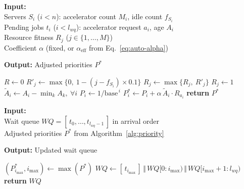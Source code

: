 \documentclass{ieeetj}
\begin{document}
\begin{algorithm}
\caption{SAFA adjusted priority}\label{alg:priority}
\textbf{Input:} \\
\hspace*{4mm} Servers $S_i$ ($i{<}n$): accelerator count $M_i$, idle count $f_{S_i}$ \\
\hspace*{4mm} Pending jobs $t_i$ ($i{<}l_{wq}$): accelerator request $a_i$, age $A_i$ \\
\hspace*{4mm} Resource fitness $R_j$ ($j\in\{1,\ldots,M\}$) \\
\hspace*{4mm} Coefficient $\alpha$ (fixed, or $\alpha_{\text{eff}}$ from Eq.~\eqref{eq:auto-alpha})
\begin{flushleft}
\textbf{Output:} Adjusted priorities $P^*$
\end{flushleft}
\begin{algorithmic}[1]
\STATE $R \gets 0$
\STATE {}
            \STATE $R'_j \gets \max\{0,\ 1 - ( j - f_{S_i} ) \times 0.1\}$ 
            \STATE $R_j \gets \max\{R_j,\ R'_j\}$
        \ELSE
            \STATE $R_j \gets 1$ 
        \ENDIF
    \ENDFOR
\ENDFOR
\STATE {}
\STATE $\tilde A_i \gets A_i - \min_k A_k,\ \forall i$ 
    \STATE $P_i \gets 1/\text{base}^{\,i}$
    \STATE $P_i^* \gets P_i + \alpha\, \tilde A_i \cdot R_{a_i}$
\ENDFOR
\STATE \textbf{return} $P^*$
\end{algorithmic}
\end{algorithm}

\begin{algorithm}
\caption{SAFA queue reordering}\label{alg:reorder}
\textbf{Input:} \\
\hspace*{4mm} Wait queue $WQ=[\,t_0,\ldots,t_{l_{wq}-1}\,]$ in arrival order \\
\hspace*{4mm} Adjusted priorities $P^*$ from Algorithm~\ref{alg:priority}
\begin{flushleft}
\textbf{Output:} Updated wait queue
\end{flushleft}
\begin{algorithmic}[1]
\STATE $(P_{i_{\max}}^*, i_{\max}) \gets \max(P^*)$
    \STATE $WQ \gets [\,t_{i_{\max}}\,] \,\Vert\, WQ[0{:}i_{\max}) \,\Vert\, WQ[i_{\max}{+}1{:}l_{wq})$ 
\ENDIF
\STATE \textbf{return} $WQ$
\end{algorithmic}
\end{algorithm}
\end{document}
